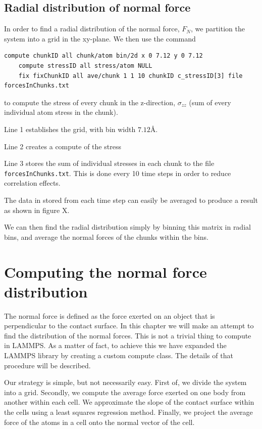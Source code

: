 \documentclass[twoside,english]{uiofysmaster}
\begin{document}
\section{Radial distribution of normal force}
In order to find a radial distribution of the normal force, $F_N$, we partition the system into a grid in  the xy-plane. We then use the command 

\begin{lstlisting}[language=LammpsInput]
	compute chunkID all chunk/atom bin/2d x 0 7.12 y 0 7.12
	compute stressID all stress/atom NULL
	fix fixChunkID all ave/chunk 1 1 10 chunkID c_stressID[3] file forcesInChunks.txt
\end{lstlisting} 
to compute the stress of every chunk in the z-direction, $\sigma_{zz}$ (sum of every individual atom stress in the chunk). 

Line 1 establishes the grid, with bin width $7.12$Å.

Line 2 creates a compute of the stress

Line 3 stores the sum of individual stresses in each chunk to the file \texttt{forcesInChunks.txt}. 
This is done every 10 time steps in order to reduce correlation effects. 

The data in stored from each time step can easily be averaged to produce a result as shown in figure X.

We can then find the radial distribution simply by binning this matrix in radial bins, and average the normal forces of the chunks within the bins.




\chapter{Computing the normal force distribution}
The normal force is defined as the force exerted on an object that is perpendicular to the contact surface. 
In this chapter we will make an attempt to find the distribution of the normal forces. 
This is not a trivial thing to compute in LAMMPS. 
As a matter of fact, to achieve this we have expanded the LAMMPS library by creating a custom compute class. 
The details of that procedure will be described. 

Our strategy is simple, but not necessarily easy. 
First of, we divide the system into a grid. 
Secondly,  we compute the average force exerted on one body from another within each cell. 
We approximate the slope of the contact surface within the cells using a least squares regression method. 
Finally, we project the average force of the atoms in a cell onto the normal vector of the cell.
\end{document}
